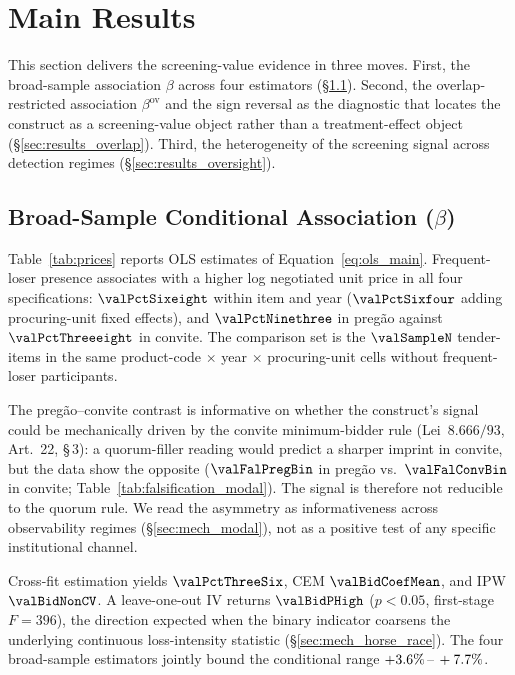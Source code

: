 \section{Main Results}
\label{sec:results}

This section delivers the screening-value evidence in three
moves. First, the broad-sample association $\beta$ across four
estimators (§\ref{sec:results_ols}). Second, the
overlap-restricted association $\beta^{\text{ov}}$ and the sign
reversal as the diagnostic that locates the construct as a
screening-value object rather than a treatment-effect object
(§\ref{sec:results_overlap}). Third, the heterogeneity of the
screening signal across detection regimes
(§\ref{sec:results_oversight}).

\subsection{Broad-Sample Conditional Association \texorpdfstring{($\beta$)}{(beta)}}
\label{sec:results_ols}

Table~\ref{tab:prices} reports OLS estimates of
Equation~\eqref{eq:ols_main}. Frequent-loser presence associates
with a higher log negotiated unit price in all four
specifications: $\valPctSixeight$ within item and year
($\valPctSixfour$ adding procuring-unit fixed effects), and
$\valPctNinethree$ in pregão against $\valPctThreeeight$ in
convite. The comparison set is the $\valSampleN$ tender-items in
the same product-code $\times$ year $\times$ procuring-unit cells
without frequent-loser participants.



The pregão--convite contrast is informative on whether the
construct's signal could be mechanically driven by the convite
minimum-bidder rule (Lei~$8.666/93$, Art.\ 22, \S\,3): a
quorum-filler reading would predict a sharper imprint in
convite, but the data show the opposite ($\valFalPregBin$ in
pregão vs.~$\valFalConvBin$ in convite;
Table~\ref{tab:falsification_modal}). The signal is therefore
not reducible to the quorum rule. We read the asymmetry as
informativeness across observability regimes
(§\ref{sec:mech_modal}), not as a positive test of any specific
institutional channel.

Cross-fit estimation yields $\valPctThreeSix$, CEM
$\valBidCoefMean$, and IPW $\valBidNonCV$. A leave-one-out IV
returns $\valBidPHigh$ ($p<0.05$, first-stage $F=396$), the
direction expected when the binary indicator coarsens the
underlying continuous loss-intensity statistic
(§\ref{sec:mech_horse_race}). The four broad-sample estimators
jointly bound the conditional range $+3.6\%\,\text{--}\,+7.7\%$.

